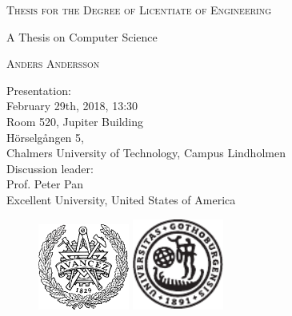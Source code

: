 \documentclass[10pt,a4paper,onecolumn,english]{book}
\newcommand{\currentyear}{2018}
\newcommand{\authorname}{Anders Andersson}
\newcommand{\mytitle}{A Thesis on Computer Science}
\newcommand{\degreetitle}{Licentiate of Engineering}
\begin{document}
\frontmatter


\thispagestyle{empty} %
\begin{center}
  \textsc{Thesis for the Degree of \degreetitle}\\
\end{center}

\vspace{1.5cm}
\begin{center} \Large \mytitle
\end{center}

\vspace{1cm}
\begin{center}
\textsc{\authorname} \\
\end{center}

\vspace{1cm}
\begin{center}
Presentation:\\
February 29th, \currentyear, 13:30\\
Room 520, Jupiter Building \\
H\"{o}rselg\aa ngen 5,\\
Chalmers University of Technology, Campus Lindholmen\\
\vspace{1cm}
Discussion leader:\\
Prof. Peter Pan\\
Excellent University, United States of America

\end{center}


\vspace{1cm}
\begin{figure}[h]
  \begin{center}
     \includegraphics[width=30mm]{Fig/Avancez50PC.pdf}
     \hspace{1cm}
     \includegraphics[width=30mm]{Fig/GU_nu.pdf}
  \end{center}
\end{figure}
\vspace{1cm}
\end{document}
